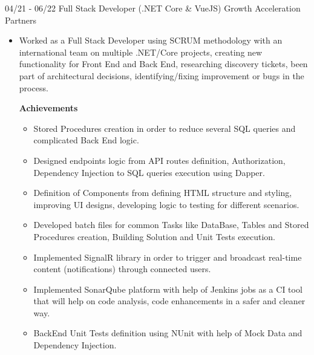 \documentclass[letterpaper]{twentysecondcv} %
\begin{document}
\begin{twenty}
{\begin{itemize}
            \end{itemize}
        }

        \twentyitem
        {04/21 - 06/22}
        {Full Stack Developer (.NET Core \& VueJS)}
        {Growth Acceleration Partners}
        {
            \begin{itemize}
                \item Worked as a Full Stack Developer using SCRUM methodology with an international team on multiple .NET/Core projects, creating new functionality for Front End and Back End, researching discovery tickets, been part of architectural decisions, identifying/fixing improvement or bugs in the process.
                
                \textbf{Achievements}
                \begin{itemize}

                    \item Stored Procedures creation in order to reduce several SQL queries and complicated Back End logic. %
                    
                    \item Designed endpoints logic from API routes definition, Authorization, Dependency Injection to SQL queries execution using Dapper.
                    
                    \item Definition of Components from defining HTML structure and styling, improving UI designs, developing logic to testing for different scenarios.  %
                    
                    \item Developed batch files for common Tasks like DataBase, Tables and Stored Procedures creation, Building Solution and Unit Tests execution.
                    
                    \item Implemented SignalR library in order to trigger and broadcast real-time content (notifications) through connected users.  %
                    
                    \item Implemented SonarQube platform with help of Jenkins jobs as a CI tool that will help on code analysis, code enhancements in a safer and cleaner way.  %
                    
                    \item BackEnd Unit Tests definition using NUnit with help of Mock Data and Dependency Injection.
                    

\end{itemize}
\end{itemize}}
\end{twenty}
\end{document}
